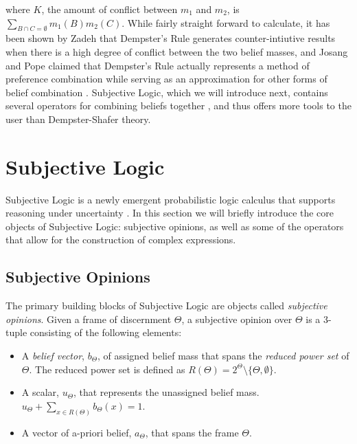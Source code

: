 \documentclass[thesis.tex]{subfiles}
\begin{document}
where $K$, the amount of conflict between $m_1$ and $m_2$, is $\sum_{B \cap C = \emptyset} m_1(B) m_2(C)$. While
fairly straight forward to calculate, it has been shown by Zadeh \cite{zadeh1979validity, zadeh1986simple}
that Dempster's Rule generates counter-intiutive results when there is a high degree of
conflict between the two belief masses, and Josang and Pope claimed that Dempster's Rule actually
represents a method of preference combination while serving as an approximation for other forms of belief
combination \cite{josang2012dempster}. Subjective Logic, which we will introduce next, contains several
operators for combining beliefs together \cite{josang2012interpretation, josang2010cumulative, josang2009fission, josang2009cumulative},
and thus offers more tools to the user than Dempster-Shafer theory.





\section{Subjective Logic}

Subjective Logic is a newly emergent probabilistic logic calculus that supports reasoning
under uncertainty \cite{josang2001logic}. In this section we will briefly introduce the
core objects of Subjective Logic: subjective opinions, as well as some of the operators that
allow for the construction of complex expressions.

\subsection{Subjective Opinions}

The primary building blocks of Subjective Logic are
objects called \emph{subjective opinions}. Given a frame of discernment $\Theta$, a subjective
opinion over $\Theta$ is a 3-tuple consisting of the following elements:

\begin{itemize}
  \item A \emph{belief vector}, $b_\Theta$, of assigned belief mass that spans the \emph{reduced power set}
    of $\Theta$. The reduced power set is defined as $R \left(\Theta\right) = 2^\Theta \setminus \lbrace \Theta, \emptyset \rbrace$.
  \item A scalar, $u_\Theta$, that represents the unassigned belief mass.
    $u_\Theta + \sum_{x \in R\left(\Theta\right)} b_\Theta\left(x\right) = 1$.
  \item A vector of a-priori belief, $a_\Theta$, that spans the frame $\Theta$.
\end{itemize}
\end{document}
